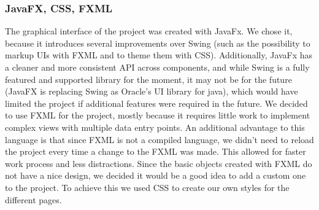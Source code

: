 \documentclass{l3proj}
\begin{document}
\subsubsection{JavaFX, CSS, FXML}
The graphical interface of the project was created with JavaFx. We chose it, because it introduces several improvements over Swing (such as the possibility to markup UIs with FXML and to theme them with CSS). Additionally, JavaFx has a cleaner and more consistent API across components, and while Swing is a fully featured and supported library for the moment, it may not be for the future (JavaFX is replacing Swing as Oracle’s UI library for java), which would have limited the project if additional features were required in the future.
We decided to use FXML for the project, mostly because it requires little work to implement complex views with multiple data entry points. An additional advantage to this language is that since FXML is not a compiled language, we didn’t need to reload the project every time a change to the FXML was made. This allowed for faster work process and less distractions. 
Since the basic objects created with FXML do not have a nice design, we decided it would be a good idea to add a custom one to the project. To achieve this we used CSS to create our own styles for the different pages.
\end{document}
